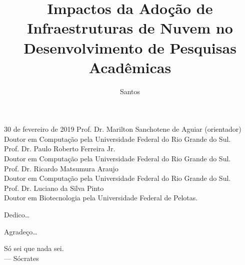 \documentclass[tese,capa]{texufpel}
\title{Impactos da Adoção de Infraestruturas de Nuvem no Desenvolvimento de Pesquisas Acadêmicas}
\author{Santos}{Maicon Ança dos}
\begin{document}
\maketitle 

\sloppy

\fichacatalografica

\begin{aprovacao}{30 de fevereiro de 2019} %
\noindent Prof. Dr. Marilton Sanchotene de Aguiar (orientador)\\
Doutor em Computação pela Universidade Federal do Rio Grande do Sul.\\[1cm]

\noindent Prof. Dr. Paulo Roberto Ferreira Jr.\\
Doutor em Computação pela Universidade Federal do Rio Grande do Sul.\\[1cm]

\noindent Prof. Dr. Ricardo Matsumura Araujo\\
Doutor em Computação pela Universidade Federal do Rio Grande do Sul.\\[1cm]

\noindent Prof. Dr. Luciano da Silva Pinto\\
Doutor em Biotecnologia pela Universidade Federal de Pelotas.
\end{aprovacao}

\begin{dedicatoria}
  Dedico\ldots 
\end{dedicatoria}

\begin{agradecimentos}
  Agradeço\ldots 
\end{agradecimentos}

\begin{epigrafe}
  Só sei que nada sei.\\
  {\sc --- Sócrates}
\end{epigrafe}

\begin{abstract}
\end{abstract}
\end{document}
